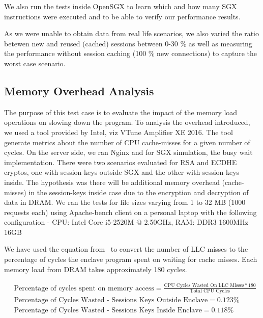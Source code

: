 \documentclass[../main.tex]{subfiles}
\begin{document}
We also run the tests inside OpenSGX to learn which and how many SGX
instructions were executed and to be able to verify our performance
results.

As we were unable to obtain data from real life scenarios, we also
varied the ratio betewen new and reused (cached) sessions between 0-30
\% as well as measuring the performance without session caching (100
\% new connections) to capture the worst case scenario.

\subsection{Memory Overhead Analysis}
The purpose of this test case is to evaluate the impact of the memory
load operations on slowing down the program. To analysis the overhead
introduced, we used a tool provided by Intel, viz VTune Amplifier XE
2016. The tool generate metrics about the number of CPU cache-misses
for a given number of cycles. On the server side, we ran Nginx and for
SGX simulation, the busy wait implementation. There were two scenarios
evaluated for RSA and ECDHE cryptos, one with session-keys outside SGX
and the other with session-keys inside. The hypothesis was there will
be additional memory overhead (cache-misses) in the session-keys
inside case due to the encryption and decryption of data in DRAM. We
ran the tests for file sizes varying from 1 to 32 MB (1000 requests
each) using Apache-bench client on a personal laptop with the
following configuration - CPU: Intel Core i5-2520M @ 2.50GHz, RAM:
DDR3 1600MHz 16GB

\begin{table}[H]
\end{table}

We have used the equation from \Intel~to convert the number of LLC misses to
the percentage of cycles the enclave program spent on waiting for
cache misses. Each memory load from DRAM takes approximately 180
cycles.

\begin{align*}
  &\text{Percentage of cycles spent on memory access} =
  \frac{\text{CPU Cycles Wasted On LLC Misses} * 180}{\text{Total CPU
  Cycles}} \\
  &\text{Percentage of Cycles Wasted - Sessions Keys Outside Enclave} = 0.123\% \\
  &\text{Percentage of Cycles Wasted - Sessions Keys Inside Enclave} = 0.118\%        
\end{align*}
\end{document}
